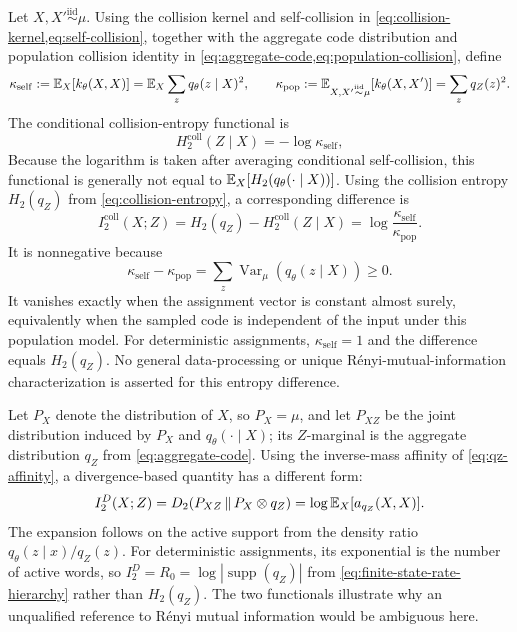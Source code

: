 Let $X,X'\overset{\mathrm{iid}}{\sim}\mu$.
Using the collision kernel and self-collision in \cref{eq:collision-kernel,eq:self-collision}, together with the aggregate code distribution and population collision identity in \cref{eq:aggregate-code,eq:population-collision}, define
\begin{equation}
\kappa_{\mathrm{self}}
:=\mathbb{E}_X[k_\theta(X,X)]
=\mathbb{E}_X\sum_zq_\theta(z\mid X)^2,
\qquad
\kappa_{\mathrm{pop}}
:=\mathbb{E}_{X,X'\overset{\mathrm{iid}}{\sim}\mu}[k_\theta(X,X')]
=\sum_zq_Z(z)^2.
\end{equation}
The conditional collision-entropy functional is
\begin{equation}
H_2^{\mathrm{coll}}(Z\mid X)=-\log \kappa_{\mathrm{self}},
\end{equation}
Because the logarithm is taken after averaging conditional self-collision, this functional is generally not equal to $\mathbb{E}_X[H_2(q_\theta(\cdot\mid X))]$.
Using the collision entropy $H_2(q_Z)$ from \cref{eq:collision-entropy}, a corresponding difference is
\begin{equation}
I_2^{\mathrm{coll}}(X;Z)
=H_2(q_Z)-H_2^{\mathrm{coll}}(Z\mid X)
=\log\frac{\kappa_{\mathrm{self}}}{\kappa_{\mathrm{pop}}}.
\label{eq:collision-information}
\end{equation}
It is nonnegative because
\begin{equation}
\kappa_{\mathrm{self}}-\kappa_{\mathrm{pop}}
=\sum_z\operatorname{Var}_\mu(q_\theta(z\mid X))\ge0.
\end{equation}
It vanishes exactly when the assignment vector is constant almost surely, equivalently when the sampled code is independent of the input under this population model.
For deterministic assignments, $\kappa_{\mathrm{self}}=1$ and the difference equals $H_2(q_Z)$.
No general data-processing or unique R\'enyi-mutual-information characterization is asserted for this entropy difference.

Let $P_X$ denote the distribution of $X$, so $P_X=\mu$, and let $P_{XZ}$ be the joint distribution induced by $P_X$ and $q_\theta(\cdot\mid X)$; its $Z$-marginal is the aggregate distribution $q_Z$ from \cref{eq:aggregate-code}.
Using the inverse-mass affinity of \cref{eq:qz-affinity}, a divergence-based quantity has a different form:
\begin{equation}
I_2^D(X;Z)
=D_2\!\left(P_{XZ}\,\middle\|\,P_X\otimes q_Z\right)
=\log\mathbb{E}_X[a_{q_Z}(X,X)].
\label{eq:divergence-renyi-information-affinity}
\end{equation}
The expansion follows on the active support from the density ratio $q_\theta(z\mid x)/q_Z(z)$.
For deterministic assignments, its exponential is the number of active words, so $I_2^D=R_0=\log|\operatorname{supp}(q_Z)|$ from \cref{eq:finite-state-rate-hierarchy} rather than $H_2(q_Z)$.
The two functionals illustrate why an unqualified reference to R\'enyi mutual information would be ambiguous here.

